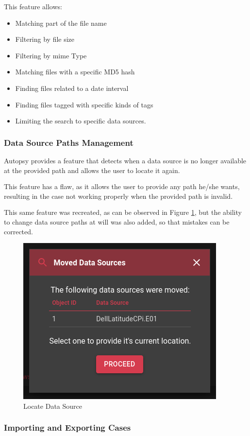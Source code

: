 This feature allows:

\begin{itemize}
 \item Matching part of the file name
 \item Filtering by file size
 \item Filtering by \acrshort{mime} Type
 \item Matching files with a specific MD5 hash
 \item Finding files related to a date interval
 \item Finding files tagged with specific kinds of tags
 \item Limiting the search to specific data sources.
\end{itemize}

\subsubsection*{Data Source Paths Management}

Autopsy provides a feature that detects when a data source is no longer available at the provided path and allows the user to locate it again.

This feature has a flaw, as it allows the user to provide any path he/she wants, resulting in the case not working properly when the provided path is invalid.

This same feature was recreated, as can be observed in Figure \ref{fig:locate}, but the ability to change data source paths at will was also added, so that mistakes can be corrected.

\begin{figure}[ht]
 \centering
 \includegraphics[width=0.6\linewidth]{imgs/locate.png}
 \caption{Locate Data Source}
 \label{fig:locate}
\end{figure}

\subsubsection*{Importing and Exporting Cases}

